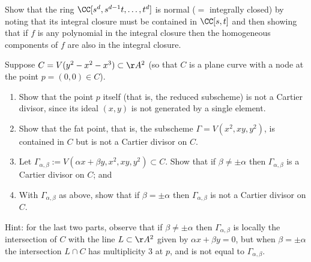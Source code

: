 \begin{exercise}\label{normality of RNC}
 Show that the ring $\CC[s^d,s^{d-1}t,\dots, t^d]$ is normal ($=$ integrally closed) by noting that its integral closure must be
 contained in $\CC[s,t]$ and then showing that if $f$ is any polynomial
 in the integral closure then the homogeneous components of $f$ are also in the integral closure.
\end{exercise}

\begin{exercise}\label{Cartier examples}
Suppose $C = V(y^2 - x^2 - x^3) \subset \AA^2$ (so that $C$ is a plane curve with a node at the point $p = (0,0) \in C$). 
\begin{enumerate}
\item Show that the point $p$ itself (that is, the reduced subscheme) is not a Cartier divisor, since its ideal $(x,y)$ is not generated by a single element. 
\item Show that the fat point, that is, the subscheme $\Gamma = V(x^2,
  xy, y^2)$, is contained in $C$ but is not a Cartier divisor on $C$. 
\item Let $\Gamma_{\alpha, \beta} := V(\alpha x + \beta y, x^2, xy, y^2) \subset C$. Show that if $\beta \neq \pm \alpha$ then $\Gamma_{\alpha, \beta}$ is a Cartier divisor on $C$; and
\item With $\Gamma_{\alpha, \beta}$ as above, show that if $\beta = \pm \alpha$ then $\Gamma_{\alpha, \beta}$ is not a Cartier divisor on $C$.
\end{enumerate}

Hint: for the last two parts, observe that if $\beta \neq \pm \alpha$ then $\Gamma_{\alpha, \beta}$  is locally the intersection of $C$ with the line $L \subset \AA^2$ given by $\alpha x + \beta y = 0$, but when $\beta = \pm \alpha$ 
the intersection $L \cap C$ has multiplicity 3 at $p$, and is not equal to $\Gamma_{\alpha, \beta}$.
\end{exercise}


